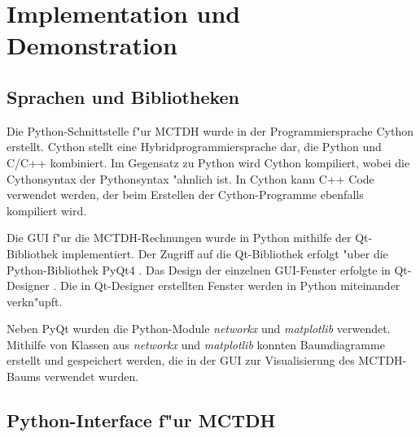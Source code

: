 \chapter{Implementation und Demonstration}
\label{cha:Implementation}

\section{Sprachen und Bibliotheken}

Die Python-Schnittstelle f"ur MCTDH wurde in der Programmiersprache Cython \cite{PyArt} erstellt. 
Cython stellt eine Hybridprogrammiersprache dar,
die Python und C/C++ kombiniert. Im Gegensatz zu Python
wird Cython kompiliert, wobei die Cythonsyntax der Pythonsyntax "ahnlich ist.
In Cython kann C++ Code verwendet werden, der beim Erstellen der Cython-Programme ebenfalls kompiliert wird.

Die GUI f"ur die MCTDH-Rechnungen wurde in Python mithilfe der Qt-Bibliothek \cite{Qt} implementiert.
Der Zugriff auf die Qt-Bibliothek  erfolgt "uber die Python-Bibliothek PyQt4 \cite{PyQt}. 
Das Design der einzelnen GUI-Fenster erfolgte in Qt-Designer \cite{Qt-Designer}. 
Die in Qt-Designer erstellten Fenster werden in Python miteinander verkn"upft.

Neben PyQt wurden die Python-Module \textit{networkx} \cite{SciPyProceedings_11} und \textit{matplotlib} \cite{Hunter:2007} verwendet.
Mithilfe von Klassen aus \textit{networkx} und \textit{matplotlib} konnten Baumdiagramme erstellt und gespei\-chert werden, die in der GUI zur 
Visualisierung des MCTDH-Baums verwendet wurden.

\section{Python-Interface f"ur MCTDH}
\label{sec:PyInterface}


